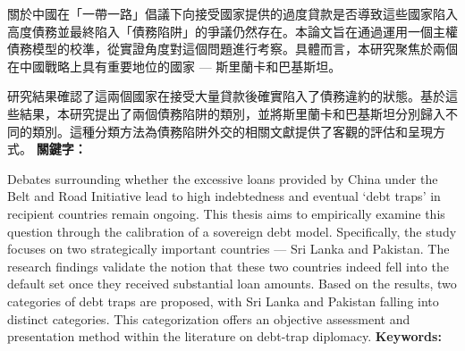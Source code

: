 \begin{abstractzh}
關於中國在「一帶一路」倡議下向接受國家提供的過度貸款是否導致這些國家陷入高度債務並最終陷入「債務陷阱」的爭議仍然存在。本論文旨在通過運用一個主權債務模型的校準，從實證角度對這個問題進行考察。具體而言，本研究聚焦於兩個在中國戰略上具有重要地位的國家 --- 斯里蘭卡和巴基斯坦。

研究結果確認了這兩個國家在接受大量貸款後確實陷入了債務違約的狀態。基於這些結果，本研究提出了兩個債務陷阱的類別，並將斯里蘭卡和巴基斯坦分別歸入不同的類別。這種分類方法為債務陷阱外交的相關文獻提供了客觀的評估和呈現方式。
\bigbreak
\noindent \textbf{關鍵字：}{\, \makeatletter \@keywordszh \makeatother}
\end{abstractzh}

\begin{abstracten}

    Debates surrounding whether the excessive loans provided by China under the Belt and Road Initiative lead to high indebtedness and eventual `debt traps' in recipient countries remain ongoing. This thesis aims to empirically examine this question through the calibration of a sovereign debt model. Specifically, the study focuses on two strategically important countries --- Sri Lanka and Pakistan.
    The research findings validate the notion that these two countries indeed fell into the default set once they received substantial loan amounts. Based on the results, two categories of debt traps are proposed, with Sri Lanka and Pakistan falling into distinct categories. This categorization offers an objective assessment and presentation method within the literature on debt-trap diplomacy.
    \bigbreak
\noindent \textbf{Keywords:}{\, \makeatletter \@keywordsen \makeatother}
\end{abstracten}

\begin{comment}
\category{I2.10}{Computing Methodologies}{Artificial Intelligence --
Vision and Scene Understanding} \category{H5.3}{Information
Systems}{Information Interfaces and Presentation (HCI) -- Web-based
Interaction.}

\terms{Design, Human factors, Performance.}

\keywords{Region of interest, Visual attention model, Web-based
games, Benchmarks.}
\end{comment}

